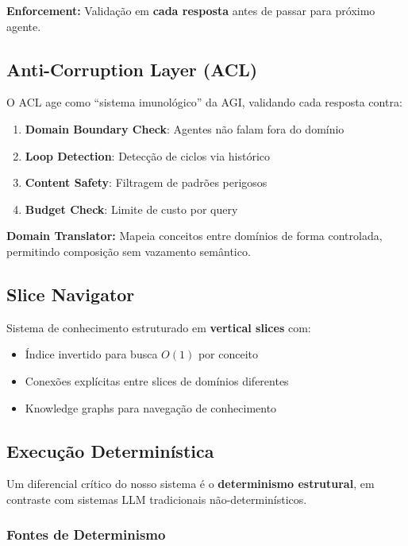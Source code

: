 \documentclass[11pt]{article}
\begin{document}
\textbf{Enforcement:} Validação em \textbf{cada resposta} antes de passar para próximo agente.

\subsection{Anti-Corruption Layer (ACL)}

O ACL age como ``sistema imunológico'' da AGI, validando cada resposta contra:

\begin{enumerate}
    \item \textbf{Domain Boundary Check}: Agentes não falam fora do domínio
    \item \textbf{Loop Detection}: Detecção de ciclos via histórico
    \item \textbf{Content Safety}: Filtragem de padrões perigosos
    \item \textbf{Budget Check}: Limite de custo por query
\end{enumerate}

\textbf{Domain Translator:} Mapeia conceitos entre domínios de forma controlada, permitindo composição sem vazamento semântico.

\subsection{Slice Navigator}

Sistema de conhecimento estruturado em \textbf{vertical slices} com:

\begin{itemize}
    \item Índice invertido para busca $O(1)$ por conceito
    \item Conexões explícitas entre slices de domínios diferentes
    \item Knowledge graphs para navegação de conhecimento
\end{itemize}

\subsection{Execução Determinística}

Um diferencial crítico do nosso sistema é o \textbf{determinismo estrutural}, em contraste com sistemas LLM tradicionais não-determinísticos.

\subsubsection{Fontes de Determinismo}
\end{document}
